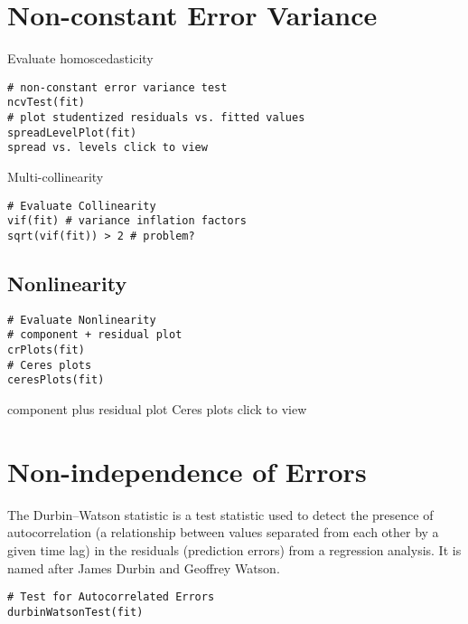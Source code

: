 \documentclass{article}
\begin{document}
\section{Non-constant Error Variance}

Evaluate homoscedasticity
\begin{framed}
\begin{verbatim}
# non-constant error variance test
ncvTest(fit)
# plot studentized residuals vs. fitted values 
spreadLevelPlot(fit)
spread vs. levels click to view
\end{verbatim}
\end{framed}
Multi-collinearity
\begin{framed}
\begin{verbatim}
# Evaluate Collinearity
vif(fit) # variance inflation factors 
sqrt(vif(fit)) > 2 # problem?
\end{verbatim}
\end{framed}
\subsection{Nonlinearity}
\begin{framed}
	\begin{verbatim}
# Evaluate Nonlinearity
# component + residual plot 
crPlots(fit)
# Ceres plots 
ceresPlots(fit)
\end{verbatim}
\end{framed}
component plus residual plot Ceres plots click to view
\section{Non-independence of Errors}

The Durbin–Watson statistic is a test statistic used to detect the presence of autocorrelation (a relationship between values separated from each other by a given time lag) in the residuals (prediction errors) from a regression analysis. It is named after James Durbin and Geoffrey Watson.
\begin{framed}
	\begin{verbatim}
# Test for Autocorrelated Errors
durbinWatsonTest(fit)
\end{verbatim}
\end{framed}
\end{document}
